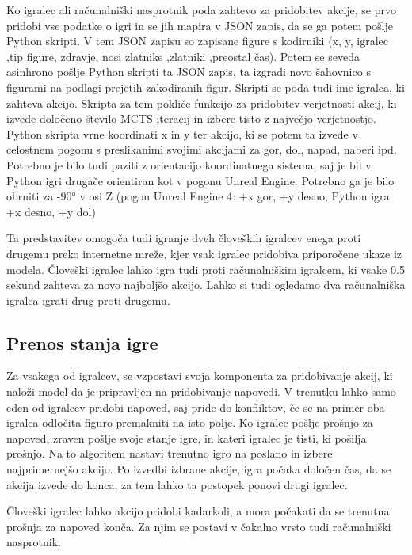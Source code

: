 \documentclass[a4paper, 12pt]{book}
\begin{document}
Ko igralec ali računalniški nasprotnik poda zahtevo za pridobitev akcije, se prvo pridobi vse podatke o igri in se jih mapira v JSON zapis, da se ga potem pošlje Python skripti.
V tem JSON zapisu so zapisane figure s kodirniki (x, y, igralec ,tip figure, zdravje, nosi zlatnike ,zlatniki ,preostal čas).
Potem se seveda asinhrono pošlje Python skripti ta JSON zapis, ta izgradi novo šahovnico s figurami na podlagi prejetih zakodiranih figur.
Skripti se poda tudi ime igralca, ki zahteva akcijo.
Skripta za tem pokliče funkcijo za pridobitev verjetnosti akcij, ki izvede določeno število MCTS iteracij in izbere tisto z največjo verjetnostjo.
Python skripta vrne koordinati x in y ter akcijo, ki se potem ta izvede v celostnem pogonu s preslikanimi svojimi akcijami za gor, dol, napad, naberi ipd.
Potrebno je bilo tudi paziti z orientacijo koordinatnega sistema, saj je bil v Python igri drugače orientiran kot v pogonu Unreal Engine. 
Potrebno ga je bilo obrniti za -90° v osi Z (pogon Unreal Engine 4: +x gor, +y desno, Python igra: +x desno, +y dol)

Ta predstavitev omogoča tudi igranje dveh človeških igralcev enega proti drugemu preko internetne mreže, kjer vsak igralec pridobiva priporočene ukaze iz modela.
Človeški igralec lahko igra tudi proti računalniškim igralcem, ki vsake 0.5 sekund zahteva za novo najboljšo akcijo.
Lahko si tudi ogledamo dva računalniška igralca igrati drug proti drugemu.

\subsection{Prenos stanja igre}
Za vsakega od igralcev, se vzpostavi svoja komponenta za pridobivanje akcij, ki naloži model da je pripravljen na pridobivanje napovedi.
V trenutku lahko samo eden od igralcev pridobi napoved, saj pride do konfliktov, če se na primer oba igralca odločita figuro premakniti na isto polje.
Ko igralec pošlje prošnjo za napoved, zraven pošlje svoje stanje igre, in kateri igralec je tisti, ki pošilja prošnjo.
Na to algoritem nastavi trenutno igro na poslano in izbere najprimernejšo akcijo.
Po izvedbi izbrane akcije, igra počaka določen čas, da se akcija izvede do konca, za tem lahko ta postopek ponovi drugi igralec.

Človeški igralec lahko akcijo pridobi kadarkoli, a mora počakati da se trenutna prošnja za napoved konča. Za njim se postavi v čakalno vrsto tudi računalniški nasprotnik.
\end{document}
